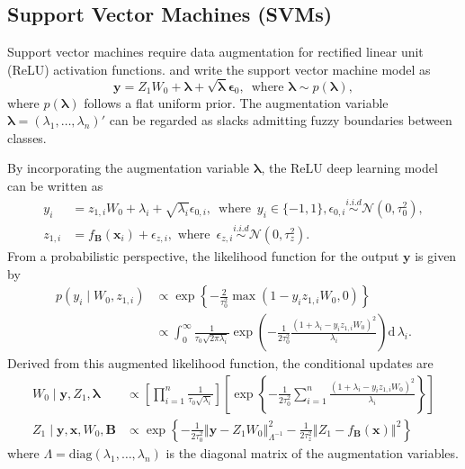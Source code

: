 \documentclass[ba]{imsart}
\newcommand{\bm}[1]{\boldsymbol{#1}}
\renewcommand{\d}{\mathrm{d}}
\newcommand{\diag}{\text{diag}}
\newcommand{\norm}[1]{\left\Vert#1\right\Vert}
\def\B{\bm{B}}
\renewcommand{\d}{\mathrm{d}\,}
\def\mN{\mathcal{N}}
\newcommand{\bx}{{\bm x}}
\newcommand{\by}{{\bm y}}
\newcommand{\bepsilon}{{\bm \epsilon}}
\newcommand{\blambda}{{\bm \lambda}}
\numberwithin{equation}{section}
\theoremstyle{plain}
\begin{document}
\subsection{Support Vector Machines (SVMs)}\label{sec:svm}

Support vector machines require data augmentation for rectified linear unit (ReLU) activation functions.  \citet{polson2011data} and \citet{mallick2005bayesian} write the support vector machine model as
\[
\by=Z_1W_0+ \blambda+\sqrt{\blambda} \bepsilon_0, \,\text{ where } \blambda\sim p(\blambda),
\]
where $p(\blambda)$ follows a flat uniform prior. The augmentation variable $\blambda=(\lambda_1, \ldots, \lambda_n)'$  can be regarded as slacks admitting fuzzy boundaries between classes.

By incorporating the augmentation variable $\blambda$, the ReLU deep learning model can be written as
\begin{align*} 
 y_i&= z_{1,i}W_0+\lambda_{i}+\sqrt{\lambda_{i}}\epsilon_{0,i}, \, \text{ where } \, y_i \in \{-1, 1\}, \epsilon_{0,i} \overset{i.i.d}{\sim} \mN(0,\tau_0^2),\\
z_{1,i} &= f_{\B}(\bx_i)+\epsilon_{z,i}, \text{ where } \, \epsilon_{z,i} \overset{i.i.d}{\sim} \mN(0, \tau_z^2).
\end{align*}
 From a probabilistic perspective, the likelihood function for the output $\by$ is given by
\begin{align*}
p (y_i \mid W_0, z_{1,i}) & \propto \exp \left\{-\frac{2}{\tau_0^2}\max (1-y_i z_{1,i}W_0,0)\right\}\\
& \propto \int_0^\infty \frac{1}{\tau_0 \sqrt{2\pi \lambda_{i}}} \exp \left( -\frac{1}{2\tau_0^2}\frac{(1+\lambda_{i}-y_i z_{1,i}W_0)^2}{\lambda_{i}}   \right)\d \lambda_{i}.
\end{align*}
Derived from this augmented likelihood function, the conditional updates are
\begin{align*}
   W_0 \mid \by, Z_1, \blambda &\propto \left[ \prod_{i=1}^n \frac{1}{\tau_0\sqrt{\lambda_{i}}} \right]\left[ \exp\left\{-\frac{1}{2\tau_0^2} \sum_{i=1}^n\frac{(1+\lambda_{i}-y_iz_{1,i}W_0)^2}{\lambda_{i}} \right\} \right]\\
     Z_1 \mid \by, \bx ,W_0, \B &\propto \exp\left\{-\frac{1}{2\tau_0^2}\norm{\by-Z_1W_0}^2_{\Lambda^{-1}}-\frac{1}{2\tau_z^2}\norm{Z_1-f_{\B}(\bx)}^2\right\} 
\end{align*}
where $\Lambda=\diag(\lambda_{1},\ldots, \lambda_{n})$ is the diagonal matrix of the augmentation variables.
\end{document}
